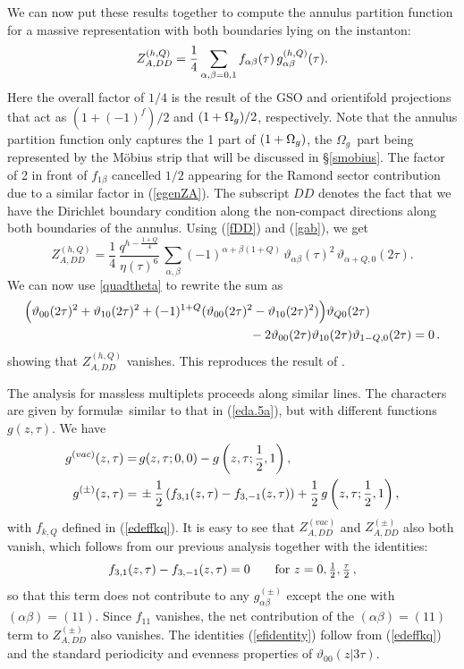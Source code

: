 \documentclass[12pt,a4paper]{article}
\newcommand{\be}{\begin{equation}}
\newcommand{\ee}{\end{equation}}
\newcommand{\refb}[1]{(\ref{#1})}
\def\({\left(}
\def\){\right)}
\newcommand{\non}{\nonumber}
\newcommand{\vt}{\vartheta}
\def\ghQ{g^{(h,Q)}}
\def\gi#1{g^{(#1)}}
\def\ZhQ{Z^{(h,Q)}}
\def\Zi#1{Z^{(#1)}}
\newcommand{\oo}{{$\Omega_g$}}
\begin{document}
We can now put these results together to compute the annulus partition function
for a massive representation with both boundaries lying on the instanton:
\be \label{edefzaii}
\ZhQ_{A,DD} = {1\over 4} \sum_{\alpha,\beta=0,1} f_{\alpha\beta}(\tau)\, \ghQ_{\alpha\beta}(\tau) .
\ee
Here the overall factor of $1/4$ is the result of the GSO and orientifold projections
that act as $(1+(-1)^f)/2$ and $(1+\hbox{\oo})/2$, respectively.
Note that the annulus partition function only captures the 1 part of $(1+\hbox{\oo})$, the \oo\ part being
represented by the M\"{o}bius strip that will be discussed in \S\ref{smobius}.
The factor of 2 in front of $f_{1\beta}$ cancelled $1/2$ appearing for the Ramond sector contribution due to
a similar factor in \refb{egenZA}. The subscript $DD$ denotes the fact that we have the Dirichlet boundary
condition along the non-compact directions along both boundaries of the annulus. Using
\refb{fDD} and \refb{gab}, we get
\be\label{ezaii}
\ZhQ_{A,DD}
= \frac{1}{4}\, \frac{q^{h-\frac{1+Q}{4}} }{\eta(\tau)^6}\,
\sum_{\alpha,\beta}(-1)^{\alpha+\beta(1+Q)}\, \vt_{\alpha\beta}(\tau)^2\, \vt_{\alpha+Q,0}(2\tau).
\ee
We can now use \eqref{quadtheta} to rewrite the sum as
\begin{align}
&\Bigl(\vt_{00}(2\tau)^2+\vt_{10}(2\tau)^2+(-1)^{1+Q}(\vt_{00}(2\tau)^2-\vt_{10}(2\tau)^2)\Bigr)\vt_{Q0}(2\tau) \non\\
&\hspace{2.5in} -2 \vt_{00}(2\tau)\vt_{10}(2\tau)\vt_{1-Q,0}(2\tau)=0 \, .
\end{align}
showing that $\ZhQ_{A,DD}$ vanishes.
This reproduces the result of \cite{Eguchi:1988vra}.



The analysis for massless multiplets proceeds along similar lines.
The characters are given
by formul\ae\ similar to that in \refb{eda.5a}, but with different functions $g(z,\tau)$.
We have \cite{Odake:1989dm}
\be
\label{echiralrep}
\begin{split}
g^{(vac)}(z,\tau) =&\, g(z,\tau;0,0) - g\(z,\tau;{1\over 2}, 1\),
\\
g^{(\pm)}(z,\tau) =&\,  \pm {1\over 2} \(f_{3,1}(z,\tau) - f_{3,-1}(z,\tau)\) + {1\over 2}\, g\(z,\tau;{1\over 2},1\) ,
\end{split}
\ee
with $f_{k,Q}$ defined in \refb{edeffkq}.
It is easy to see that $\Zi{vac}_{A,DD}$ and $\Zi{\pm}_{A,DD}$ also both vanish, which
follows from our previous analysis together with the identities:
\be\label{efidentity}
f_{3,1}(z,\tau) - f_{3,-1}(z,\tau)=0
\qquad
\hbox{for $z=0,{1\over 2}, {\tau\over 2}$}\, ,
\ee
so that this term does not contribute to any $\gi{\pm}_{\alpha\beta}$ except the one with
$(\alpha\beta)=(11)$. Since $f_{11}$ vanishes, the net contribution of the
$(\alpha\beta)=(11)$ term
to $\Zi{\pm}_{A,DD}$ also vanishes.
The identities \refb{efidentity} follow from \refb{edeffkq} and the standard periodicity and evenness
properties of $\vt_{00}(z|3\tau)$.
\end{document}

